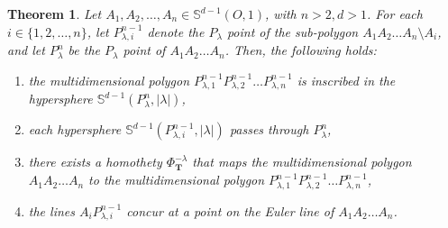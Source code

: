 \documentclass[10pt,a4paper]{amsart}
\newtheorem{thm}{Theorem}
\begin{document}
\begin{thm}\label{themG}
    Let $A_1, A_2, \ldots, A_n \in \mathbb{S}^{d-1}(O,1)$, with $n > 2, d > 1$. For each $i \in \{1,2,\ldots,n\}$, let $P_{\lambda, i}^{n-1}$ denote the $P_{\lambda}$ point of the sub-polygon $A_1A_2\ldots A_n \setminus A_i$, and let $P_{\lambda}^n$ be the $P_{\lambda}$ point of $A_1A_2\ldots A_n$. Then, the following holds:
    \begin{enumerate}
        \item the multidimensional polygon $P_{\lambda,1}^{n-1}P_{\lambda,2}^{n-1}\ldots P_{\lambda,n}^{n-1}$ is inscribed in the hypersphere $\mathbb{S}^{d-1}(P_{\lambda}^n, |\lambda|)$,
        \item each hypersphere $\mathbb{S}^{d-1}(P_{\lambda, i}^{n-1},|\lambda|)$ passes through $P_{\lambda}^{n}$,
        \item there exists a homothety $\Phi_{\mathbf{T}}^{-\lambda}$ that maps the multidimensional polygon $A_1A_2\ldots A_n$ to the multidimensional polygon $P_{\lambda,1}^{n-1}P_{\lambda,2}^{n-1}\ldots P_{\lambda,n}^{n-1}$,
        \item the lines $A_iP_{\lambda,i}^{n-1}$ concur at a point on the Euler line of $A_1A_2\ldots A_n$.
    \end{enumerate}
\end{thm}
\end{document}
